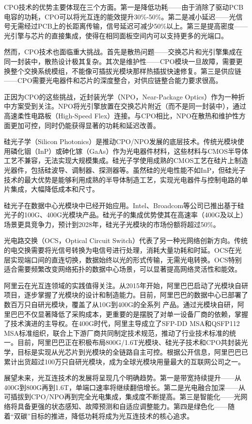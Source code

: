 CPO技术的优势主要体现在三个方面。第一是降低功耗——由于消除了驱动PCB电容的功耗，CPO可以将光互连的能效提升30\%-50\%。第二是减小延迟——光信号无需经过PCB上的长距离传输，信号延迟可减少50\%以上。第三是提高密度——光引擎与芯片的直接集成，使得在相同面板空间内可以支持更多的光端口。

然而，CPO技术也面临重大挑战。首先是散热问题——交换芯片和光引擎集成在同一封装中，散热设计极其复杂。其次是维护性——CPO模块一旦故障，需要更换整个交换系统模组，不能像可插拔光模块那样热插拔快速修复。第三是供应链——CPO需要光电器件和芯片的深度整合，对供应链整合能力要求很高。

正因为CPO的这些挑战，近封装光学（NPO，Near-Package Optics）作为一种折中方案受到关注。NPO将光引擎放置在交换芯片附近（而不是同一封装中），通过高速柔性电路板（High-Speed Flex）连接。与CPO相比，NPO在散热和维护性方面更加可控，同时仍能获得显著的功耗和延迟改善。

硅光子学（Silicon Photonics）是推动CPO/NPO发展的底层技术。传统光模块使用磷化铟（InP）或砷化镓（GaAs）作为光电器件材料，这些材料与CMOS半导体工艺不兼容，无法实现大规模集成。硅光子学使用成熟的CMOS工艺在硅片上制造光器件，包括硅波导、调制器、探测器等。虽然硅的光电性能不如InP，但硅光子技术的最大优势是能够利用成熟的半导体制造工艺，实现光电器件与控制电路的单片集成，大幅降低成本和尺寸。

硅光子在数据中心光模块中已经开始应用。Intel、Broadcom等公司已推出基于硅光子的100G、400G光模块产品。硅光子的集成优势使其在高速率（400G及以上）场景更具竞争力，预计到2028年，硅光子光模块的市场份额将超过50\%。

光电路交换（OCS，Optical Circuit Switch）代表了另一种光网络创新方向。传统的电交换需要将光信号转换为电信号进行处理，消耗大量功耗和时延。OCS在光层实现端口间的直连切换，数据始终以光的形式传输，无需光电转换。OCS特别适合需要频繁改变网络拓扑的数据中心场景，可以显著提高网络灵活性和能效。

阿里云在光互连领域的实践值得关注。从2015年开始，阿里巴巴启动了光模块自研项目，逐步掌握了光模块的设计和制造能力。目前，阿里巴巴的数据中心已部署了数百万只自研光模块，覆盖了从10G到400G的全系列 产品。通过光模块自研，阿里巴巴不仅显著降低了采购成本，更重要的是摆脱了对单一设备厂商的依赖，掌握了技术演进的主导权。在400G时代，阿里主导成立了SFP-DD MSA和QSFP112 MSA标准组织，联合上下游厂商共同制定技术规范，推动了行业技术标准的统一。目前，阿里巴巴正在积极布局800G/1.6T光模块、硅光子技术和CPO共封装光学，目标是实现从光芯片到光模块的全链路自主可控。根据公开信息，阿里巴巴已累计出货超过100万只自研光模块，成为全球光模块用量最大的互联网公司之一。

展望未来，光互连技术的发展将呈现几个明确趋势。第一是带宽持续提升——从400G到800G再到1.6T，单端口速率将继续翻倍增长。第二是光电融合加深——从可插拔到CPO/NPO再到完全光电集成，集成度不断提高。第三是智能化——光网络将具备更强的状态感知、故障预测和自适应调整能力。第四是绿色化——随着“双碳”目标的推进，降低功耗将成为光互连技术的核心追求。

